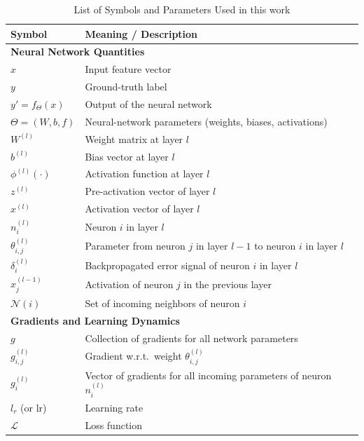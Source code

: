 \begin{table}[H]
\centering
\caption{List of Symbols and Parameters Used in this work}
\label{tab:params-appendix}
\label{tab:params-full}
\renewcommand{\arraystretch}{1.2}
\begin{tabular}{ll}
\hline
\textbf{Symbol} & \textbf{Meaning / Description} \\
\hline
\multicolumn{2}{l}{\textbf{Neural Network Quantities}} \\
$x$ & Input feature vector \\
$y$ & Ground-truth label \\
$y' = f_\Theta(x)$ & Output of the neural network \\
$\Theta = (W,b,f)$ & Neural-network parameters (weights, biases, activations) \\
$W^{(l)}$ & Weight matrix at layer $l$ \\
$b^{(l)}$ & Bias vector at layer $l$ \\
$\phi^{(l)}(\cdot)$ & Activation function at layer $l$ \\
$z^{(l)}$ & Pre-activation vector of layer $l$ \\
$x^{(l)}$ & Activation vector of layer $l$ \\
$n_i^{(l)}$ & Neuron $i$ in layer $l$ \\
$\theta^{(l)}_{i,j}$ & Parameter from neuron $j$ in layer $l\!-\!1$ to neuron $i$ in layer $l$ \\
$\delta^{(l)}_i$ & Backpropagated error signal of neuron $i$ in layer $l$ \\
$x^{(l-1)}_j$ & Activation of neuron $j$ in the previous layer \\
$\mathcal{N}(i)$ & Set of incoming neighbors of neuron $i$ \\[4pt]

\multicolumn{2}{l}{\textbf{Gradients and Learning Dynamics}} \\
$g$ & Collection of gradients for all network parameters \\
$g^{(l)}_{i,j}$ & Gradient w.r.t.\ weight $\theta^{(l)}_{i,j}$ \\
$g^{(l)}_i$ & Vector of gradients for all incoming parameters of neuron $n_i^{(l)}$ \\
$l_r$ (or $\mathrm{lr}$) & Learning rate \\
$\mathcal{L}$ & Loss function \\[4pt]


\end{tabular}
\end{table}
